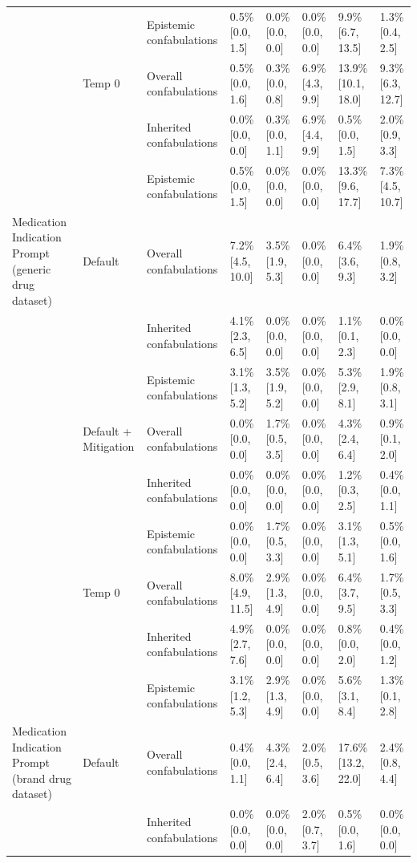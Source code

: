 \begin{tabular}{llllllll}
 &  & Epistemic confabulations & 0.5\% [0.0, 1.5] & 0.0\% [0.0, 0.0] & 0.0\% [0.0, 0.0] & 9.9\% [6.7, 13.5] & 1.3\% [0.4, 2.5] \\
 & Temp 0 & Overall confabulations & 0.5\% [0.0, 1.6] & 0.3\% [0.0, 0.8] & 6.9\% [4.3, 9.9] & 13.9\% [10.1, 18.0] & 9.3\% [6.3, 12.7] \\
 &  & Inherited confabulations & 0.0\% [0.0, 0.0] & 0.3\% [0.0, 1.1] & 6.9\% [4.4, 9.9] & 0.5\% [0.0, 1.5] & 2.0\% [0.9, 3.3] \\
 &  & Epistemic confabulations & 0.5\% [0.0, 1.5] & 0.0\% [0.0, 0.0] & 0.0\% [0.0, 0.0] & 13.3\% [9.6, 17.7] & 7.3\% [4.5, 10.7] \\
Medication Indication Prompt (generic drug dataset) & Default & Overall confabulations & 7.2\% [4.5, 10.0] & 3.5\% [1.9, 5.3] & 0.0\% [0.0, 0.0] & 6.4\% [3.6, 9.3] & 1.9\% [0.8, 3.2] \\
 &  & Inherited confabulations & 4.1\% [2.3, 6.5] & 0.0\% [0.0, 0.0] & 0.0\% [0.0, 0.0] & 1.1\% [0.1, 2.3] & 0.0\% [0.0, 0.0] \\
 &  & Epistemic confabulations & 3.1\% [1.3, 5.2] & 3.5\% [1.9, 5.2] & 0.0\% [0.0, 0.0] & 5.3\% [2.9, 8.1] & 1.9\% [0.8, 3.1] \\
 & Default + Mitigation & Overall confabulations & 0.0\% [0.0, 0.0] & 1.7\% [0.5, 3.5] & 0.0\% [0.0, 0.0] & 4.3\% [2.4, 6.4] & 0.9\% [0.1, 2.0] \\
 &  & Inherited confabulations & 0.0\% [0.0, 0.0] & 0.0\% [0.0, 0.0] & 0.0\% [0.0, 0.0] & 1.2\% [0.3, 2.5] & 0.4\% [0.0, 1.1] \\
 &  & Epistemic confabulations & 0.0\% [0.0, 0.0] & 1.7\% [0.5, 3.3] & 0.0\% [0.0, 0.0] & 3.1\% [1.3, 5.1] & 0.5\% [0.0, 1.6] \\
 & Temp 0 & Overall confabulations & 8.0\% [4.9, 11.5] & 2.9\% [1.3, 4.9] & 0.0\% [0.0, 0.0] & 6.4\% [3.7, 9.5] & 1.7\% [0.5, 3.3] \\
 &  & Inherited confabulations & 4.9\% [2.7, 7.6] & 0.0\% [0.0, 0.0] & 0.0\% [0.0, 0.0] & 0.8\% [0.0, 2.0] & 0.4\% [0.0, 1.2] \\
 &  & Epistemic confabulations & 3.1\% [1.2, 5.3] & 2.9\% [1.3, 4.9] & 0.0\% [0.0, 0.0] & 5.6\% [3.1, 8.4] & 1.3\% [0.1, 2.8] \\
Medication Indication Prompt (brand drug dataset) & Default & Overall confabulations & 0.4\% [0.0, 1.1] & 4.3\% [2.4, 6.4] & 2.0\% [0.5, 3.6] & 17.6\% [13.2, 22.0] & 2.4\% [0.8, 4.4] \\
 &  & Inherited confabulations & 0.0\% [0.0, 0.0] & 0.0\% [0.0, 0.0] & 2.0\% [0.7, 3.7] & 0.5\% [0.0, 1.6] & 0.0\% [0.0, 0.0] \\

\end{tabular}
